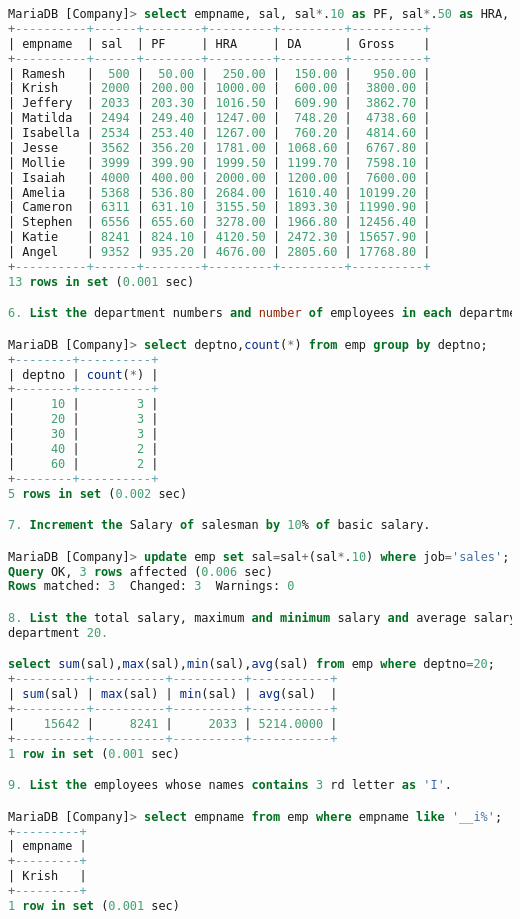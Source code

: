 \documentclass[11pt]{article}
\begin{document}
\begin{lstlisting}[language=SQL]
MariaDB [Company]> select empname, sal, sal*.10 as PF, sal*.50 as HRA, sal*.30 as DA, sal + sal*.90 as Gross from emp order by Gross;
+----------+------+--------+---------+---------+----------+
| empname  | sal  | PF     | HRA     | DA      | Gross    |
+----------+------+--------+---------+---------+----------+
| Ramesh   |  500 |  50.00 |  250.00 |  150.00 |   950.00 |
| Krish    | 2000 | 200.00 | 1000.00 |  600.00 |  3800.00 |
| Jeffery  | 2033 | 203.30 | 1016.50 |  609.90 |  3862.70 |
| Matilda  | 2494 | 249.40 | 1247.00 |  748.20 |  4738.60 |
| Isabella | 2534 | 253.40 | 1267.00 |  760.20 |  4814.60 |
| Jesse    | 3562 | 356.20 | 1781.00 | 1068.60 |  6767.80 |
| Mollie   | 3999 | 399.90 | 1999.50 | 1199.70 |  7598.10 |
| Isaiah   | 4000 | 400.00 | 2000.00 | 1200.00 |  7600.00 |
| Amelia   | 5368 | 536.80 | 2684.00 | 1610.40 | 10199.20 |
| Cameron  | 6311 | 631.10 | 3155.50 | 1893.30 | 11990.90 |
| Stephen  | 6556 | 655.60 | 3278.00 | 1966.80 | 12456.40 |
| Katie    | 8241 | 824.10 | 4120.50 | 2472.30 | 15657.90 |
| Angel    | 9352 | 935.20 | 4676.00 | 2805.60 | 17768.80 |
+----------+------+--------+---------+---------+----------+
13 rows in set (0.001 sec)

6. List the department numbers and number of employees in each department.

MariaDB [Company]> select deptno,count(*) from emp group by deptno;
+--------+----------+
| deptno | count(*) |
+--------+----------+
|     10 |        3 |
|     20 |        3 |
|     30 |        3 |
|     40 |        2 |
|     60 |        2 |
+--------+----------+
5 rows in set (0.002 sec)

7. Increment the Salary of salesman by 10% of basic salary.

MariaDB [Company]> update emp set sal=sal+(sal*.10) where job='sales';
Query OK, 3 rows affected (0.006 sec)
Rows matched: 3  Changed: 3  Warnings: 0

8. List the total salary, maximum and minimum salary and average salary of the employees, for
department 20.

select sum(sal),max(sal),min(sal),avg(sal) from emp where deptno=20;
+----------+----------+----------+-----------+
| sum(sal) | max(sal) | min(sal) | avg(sal)  |
+----------+----------+----------+-----------+
|    15642 |     8241 |     2033 | 5214.0000 |
+----------+----------+----------+-----------+
1 row in set (0.001 sec)

9. List the employees whose names contains 3 rd letter as 'I'.

MariaDB [Company]> select empname from emp where empname like '__i%';
+---------+
| empname |
+---------+
| Krish   |
+---------+
1 row in set (0.001 sec)


\end{lstlisting}
\end{document}
